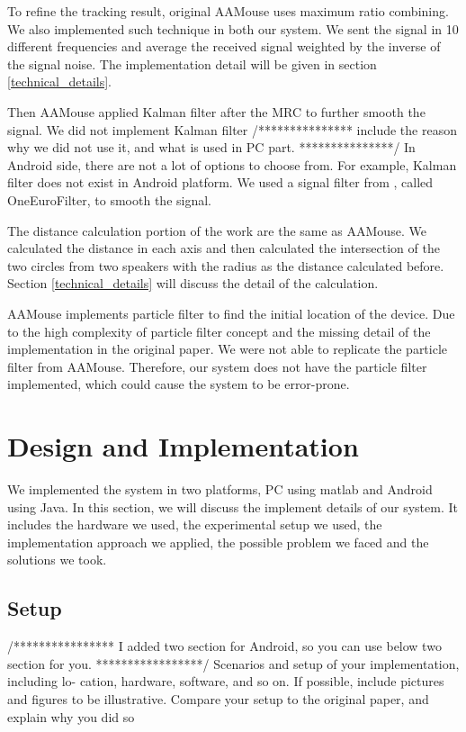 \documentclass{acm_proc_article-sp}
\begin{document}
To refine the tracking result, original AAMouse uses maximum ratio combining. We also
implemented such technique in both our system. We sent the signal in 10 different
frequencies and average the received signal weighted by the inverse of the signal noise.
The implementation detail will be given in section \ref{technical_details}.

Then AAMouse applied Kalman filter after the MRC to further smooth the signal.
We did not implement Kalman filter 
/***************
include the reason why we did not use it, and what is used in PC part.
***************/
In Android side, there are not a lot of options to choose from. For example, 
Kalman filter does not exist in Android platform.
We used a signal
filter from \cite{SignalFilter}, called OneEuroFilter, to smooth the signal.

The distance calculation portion of the work are the same as AAMouse. We calculated the
distance in each axis and then calculated the intersection of the two circles from two
speakers with the radius as the distance calculated before. Section
\ref{technical_details} will discuss the detail of the calculation.

AAMouse implements particle filter to find the initial location of the device. Due to the 
high complexity of particle filter concept and the missing detail of the implementation
in the original paper. We were not able to replicate the particle filter from AAMouse.
Therefore, our system does not have the particle filter implemented, which could cause
the system to be error-prone.

\section{Design and Implementation} \label{design_and_implementation}
We implemented the system in two platforms, PC using matlab and Android using Java. In 
this section, we will discuss the implement details of our system. It includes the 
hardware we used, the experimental setup we used, the implementation approach we applied,
the possible problem we faced and the solutions we took.

\subsection{Setup}
/****************
I added two section for Android, so you can use below two section for you.
*****************/
Scenarios  and  setup  of  your  implementation,  including  lo-
cation,  hardware,  software,  and so on.  If possible,  include
pictures and figures to be illustrative.  Compare your setup
to the original paper, and explain why you did so
\end{document}

